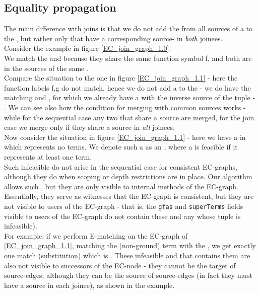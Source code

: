 \subsection{Equality propagation}
The main difference with joins is that we do not add the \GFAs{} from all sources of a \GT{} to the \GT{}, 
but rather only \GFAs{} that have a corresponding source-\GFA{} in \emph{both} joinees.\\
Consider the example in figure \ref{EC_join_graph_1.0}.\\
We match the \GFAs{}  and  because they share the same function symbol f, 
and both \GFAs{} are in the sources of the same \GT{}.\\
Compare the situation to the one in figure \ref{EC_join_graph_1.1} - here the function labels f,g do not match, hence we do not add a \GFA{} to the \GT{}  - we do have the matching \GFAs{}  and , for which we already have a \GFA{} with the inverse source of the tuple - . We can see also how the condition for merging with common sources works - while for the sequential case any two \GTs{} that share a source are merged, for the join case we merge \GTs{} only if they share a source in \emph{all} joinees.\\
Now consider the situation in figure \ref{EC_join_graph_1.1} - here we have a \GT{} in  which represents no terms.
We denote such a \GT{} as an  \GT{}, where a \GT{} is feasible if it represents at least one term.\\
Such infeasible \GTs{} do not arise in the sequential case for consistent EC-graphs, although they do when scoping or depth restrictions are in place.
Our algorithm allows such \GTs{}, but they are only visible to internal methods of the EC-graph. Essentially, they serve as witnesses that the EC-graph is consistent, but they are not visible to users of the EC-graph - that is, the \lstinline|gfas| and \lstinline|superTerms| fields visible to users of the EC-graph do not contain these \GTs{} and any \GFA{} whose tuple is infeasible).\\
For example, if we perform E-matching on the EC-graph of \ref{EC_join_graph_1.1}, matching the (non-ground) term  with the \GT{} , we get exactly one match (substitution) which is \m{[x \mapsto [a]_n]}. 
These infeasible \GTs{} and \GFAs{} that contains them are also not visible to successors of the EC-node - they cannot be the target of source-edges, although they can be the source of source-edges (in fact they must have a source in each joinee), as shown in the example.


